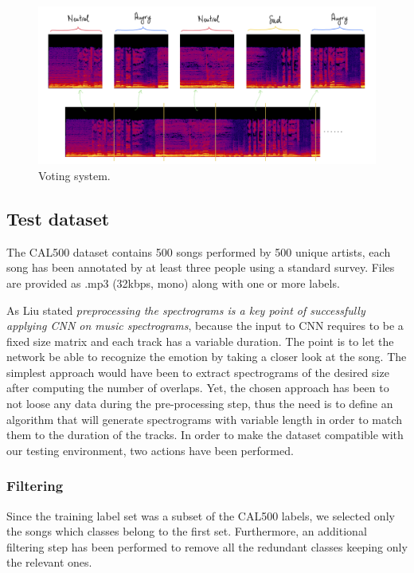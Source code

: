 \documentclass[10pt,twocolumn,letterpaper]{article}
\begin{document}
   \begin{figure}
      \begin{center}
      \includegraphics[width=0.8\linewidth]{img/voting-system}
      \end{center}
         \caption{Voting system.}
      \label{fig:voting}
      \end{figure}

\subsection{Test dataset}\label{test-dataset}

The CAL500 dataset contains 500 songs performed by 500 unique artists, each song has been annotated by at least three people using a standard survey. Files are provided as .mp3 (32kbps, mono) along with one or more labels.

As Liu \etal \cite{Liu} stated \textit{preprocessing the spectrograms is a key point of successfully applying CNN on music spectrograms}, because the input to CNN requires to be a fixed size matrix and each track has a variable duration. The point is to let the network be able to recognize the emotion by taking a closer look at the song. The simplest approach would have been to extract spectrograms of the desired size after computing the number of overlaps. Yet, the chosen approach has been to not loose any data during the pre-processing step, thus the need is to define an algorithm that will generate spectrograms with variable length in order to match them to the duration of the tracks.
In order to make the dataset compatible with our testing environment, two actions have been performed.

\subsubsection{Filtering}\label{filtering}

Since the training label set was a subset of the CAL500 labels, we selected only the songs which classes belong to the first set. Furthermore, an additional filtering step has been performed to remove all the redundant classes keeping only the relevant ones.
\end{document}
